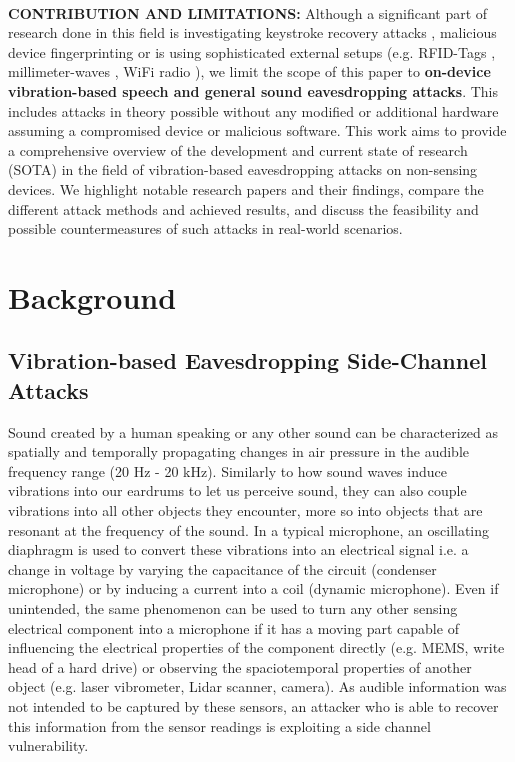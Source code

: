 \documentclass[sigconf, nonacm]{acmart}
\begin{document}
\\
\begin{sloppypar}
  \noindent
  \textbf{CONTRIBUTION AND LIMITATIONS:} Although a significant part of research done in this field is investigating keystroke recovery attacks \cite{Touchtone2023}\cite{TouchLogger2011}\cite{TapLogger2012}, malicious device fingerprinting \cite{AccelerometerFingerprinting2016}\cite{MEMSFingerprinting2013} or is using sophisticated external setups (e.g. RFID-Tags \cite{RFMic2023}, millimeter-waves \cite{MMMic2022}, WiFi radio \cite{ART2015}), we limit the scope of this paper to \textbf{on-device vibration-based speech and general sound eavesdropping attacks}.
  This includes attacks in theory possible without any modified or additional hardware assuming a compromised device or malicious software.
  This work aims to provide a comprehensive overview of the development and current state of research (SOTA) in the field of vibration-based eavesdropping attacks on non-sensing devices.
  We highlight notable research papers and their findings, compare the different attack methods and achieved results, and discuss the feasibility and possible countermeasures of such attacks in real-world scenarios.
\end{sloppypar}

\section{Background}
\subsection{Vibration-based Eavesdropping Side-Channel Attacks}
Sound created by a human speaking or any other sound can be characterized as spatially and temporally propagating changes in air pressure in the audible frequency range (20 Hz - 20 kHz).
Similarly to how sound waves induce vibrations into our eardrums to let us perceive sound, they can also couple vibrations into all other objects they encounter, more so into objects that are resonant at the frequency of the sound.
In a typical microphone, an oscillating diaphragm is used to convert these vibrations into an electrical signal i.e. a change in voltage by varying the capacitance of the circuit (condenser microphone) or by inducing a current into a coil (dynamic microphone).
Even if unintended, the same phenomenon can be used to turn any other sensing electrical component into a microphone if it has a moving part capable of influencing the electrical properties of the component directly (e.g. MEMS, write head of a hard drive) or observing the spaciotemporal properties of another object (e.g. laser vibrometer, Lidar scanner, camera).
As audible information was not intended to be captured by these sensors, an attacker who is able to recover this information from the sensor readings is exploiting a side channel vulnerability.
\end{document}
